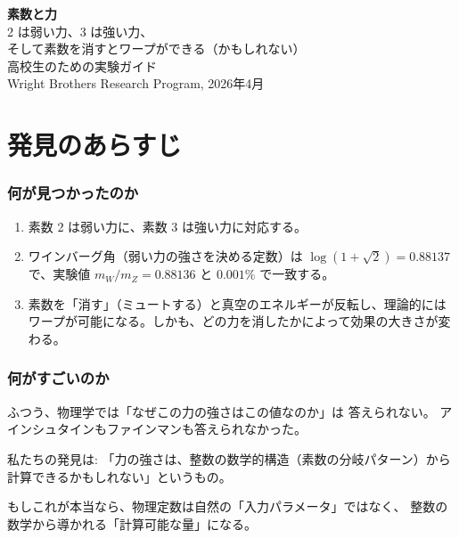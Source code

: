 \documentclass[12pt,a4paper]{article}
\begin{document}
\begin{center}
{\Huge\bfseries 素数と力}\\[0.5cm]
{\Large 2 は弱い力、3 は強い力、}\\[0.2cm]
{\Large そして素数を消すとワープができる（かもしれない）}\\[1cm]
{\large 高校生のための実験ガイド}\\[0.5cm]
{\large Wright Brothers Research Program, 2026年4月}
\end{center}

\vspace{0.5cm}
\tableofcontents
\newpage

\part{発見のあらすじ}

\section{何が見つかったのか}

\begin{resultbox}[3行まとめ]
\begin{enumerate}
\item 素数 2 は弱い力に、素数 3 は強い力に対応する。
\item ワインバーグ角（弱い力の強さを決める定数）は $\log(1+\sqrt{2}) = 0.88137$ で、実験値 $m_W/m_Z = 0.88136$ と $0.001\%$ で一致する。
\item 素数を「消す」（ミュートする）と真空のエネルギーが反転し、理論的にはワープが可能になる。しかも、どの力を消したかによって効果の大きさが変わる。
\end{enumerate}
\end{resultbox}

\section{何がすごいのか}

\begin{storybox}[ふつうの物理学との違い]
ふつう、物理学では「なぜこの力の強さはこの値なのか」は
答えられない。
アインシュタインもファインマンも答えられなかった。

私たちの発見は:
「力の強さは、整数の数学的構造（素数の分岐パターン）から
計算できるかもしれない」というもの。

もしこれが本当なら、物理定数は自然の「入力パラメータ」ではなく、
整数の数学から導かれる「計算可能な量」になる。
\end{storybox}
\end{document}

